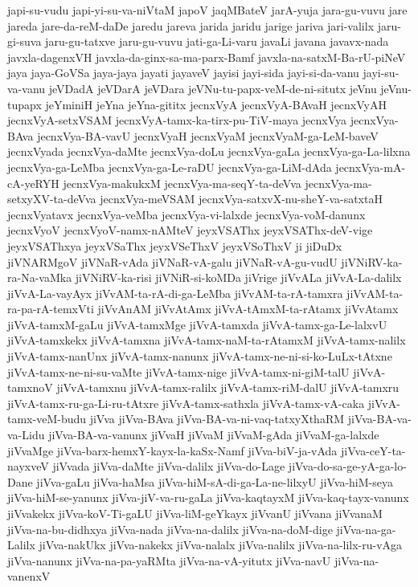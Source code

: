{japi-su-vudu
japi-yi-su-va-niVtaM
japoV
jaqMBateV
jarA-yuja
jara-gu-vuvu
jare
jareda
jare-da-reM-daDe
jaredu
jareva
jarida
jaridu
jarige
jariva
jari-valilx
jaru-gi-suva
jaru-gu-tatxve
jaru-gu-vuvu
jati-ga-Li-varu
javaLi
javana
javavx-nada
javxla-dagenxVH
javxla-da-ginx-sa-ma-parx-Bamf
javxla-na-satxM-Ba-rU-piNeV
jaya
jaya-GoVSa
jaya-jaya
jayati
jayaveV
jayisi
jayi-sida
jayi-si-da-vanu
jayi-su-va-vanu
jeVDadA
jeVDarA
jeVDara
jeVNu-tu-papx-veM-de-ni-situtx
jeVnu
jeVnu-tupapx
jeYminiH
jeYna
jeYna-gititx
jecnxVyA
jecnxVyA-BAvaH
jecnxVyAH
jecnxVyA-setxVSAM
jecnxVyA-tamx-ka-tirx-pu-TiV-maya
jecnxVya
jecnxVya-BAva
jecnxVya-BA-vavU
jecnxVyaH
jecnxVyaM
jecnxVyaM-ga-LeM-baveV
jecnxVyada
jecnxVya-daMte
jecnxVya-doLu
jecnxVya-gaLa
jecnxVya-ga-La-lilxna
jecnxVya-ga-LeMba
jecnxVya-ga-Le-raDU
jecnxVya-ga-LiM-dAda
jecnxVya-mA-cA-yeRYH
jecnxVya-makukxM
jecnxVya-ma-seqY-ta-deVva
jecnxVya-ma-setxyXV-ta-deVva
jecnxVya-meVSAM
jecnxVya-satxvX-nu-sheY-va-satxtaH
jecnxVyatavx
jecnxVya-veMba
jecnxVya-vi-lalxde
jecnxVya-voM-danunx
jecnxVyoV
jecnxVyoV-namx-nAMteV
jeyxVSAThx
jeyxVSAThx-deV-vige
jeyxVSAThxya
jeyxVSaThx
jeyxVSeThxV
jeyxVSoThxV
ji
jiDuDx
jiVNARMgoV
jiVNaR-vAda
jiVNaR-vA-galu
jiVNaR-vA-gu-vudU
jiVNiRV-ka-ra-Na-vaMka
jiVNiRV-ka-risi
jiVNiR-si-koMDa
jiVrige
jiVvALa
jiVvA-La-dalilx
jiVvA-La-vayAyx
jiVvAM-ta-rA-di-ga-LeMba
jiVvAM-ta-rA-tamxra
jiVvAM-ta-ra-pa-rA-temxVti
jiVvAnAM
jiVvAtAmx
jiVvA-tAmxM-ta-rAtamx
jiVvAtamx
jiVvA-tamxM-gaLu
jiVvA-tamxMge
jiVvA-tamxda
jiVvA-tamx-ga-Le-lalxvU
jiVvA-tamxkekx
jiVvA-tamxna
jiVvA-tamx-naM-ta-rAtamxM
jiVvA-tamx-nalilx
jiVvA-tamx-nanUnx
jiVvA-tamx-nanunx
jiVvA-tamx-ne-ni-si-ko-LuLx-tAtxne
jiVvA-tamx-ne-ni-su-vaMte
jiVvA-tamx-nige
jiVvA-tamx-ni-giM-talU
jiVvA-tamxnoV
jiVvA-tamxnu
jiVvA-tamx-ralilx
jiVvA-tamx-riM-dalU
jiVvA-tamxru
jiVvA-tamx-ru-ga-Li-ru-tAtxre
jiVvA-tamx-sathxla
jiVvA-tamx-vA-caka
jiVvA-tamx-veM-budu
jiVva
jiVva-BAva
jiVva-BA-va-ni-vaq-tatxyXthaRM
jiVva-BA-va-va-Lidu
jiVva-BA-va-vanunx
jiVvaH
jiVvaM
jiVvaM-gAda
jiVvaM-ga-lalxde
jiVvaMge
jiVva-barx-hemxY-kayx-la-kaSx-Namf
jiVva-biV-ja-vAda
jiVva-ceY-ta-nayxveV
jiVvada
jiVva-daMte
jiVva-dalilx
jiVva-do-Lage
jiVva-do-sa-ge-yA-ga-lo-Dane
jiVva-gaLu
jiVva-haMsa
jiVva-hiM-sA-di-ga-La-ne-lilxyU
jiVva-hiM-seya
jiVva-hiM-se-yanunx
jiVva-jiV-va-ru-gaLa
jiVva-kaqtayxM
jiVva-kaq-tayx-vanunx
jiVvakekx
jiVva-koV-Ti-gaLU
jiVva-liM-geYkayx
jiVvanU
jiVvana
jiVvanaM
jiVva-na-bu-didhxya
jiVva-nada
jiVva-na-dalilx
jiVva-na-doM-dige
jiVva-na-ga-Lalilx
jiVva-nakUkx
jiVva-nakekx
jiVva-nalalx
jiVva-nalilx
jiVva-na-lilx-ru-vAga
jiVva-nanunx
jiVva-na-pa-yaRMta
jiVva-na-vA-yitutx
jiVva-navU
jiVva-na-vanenxV
}
